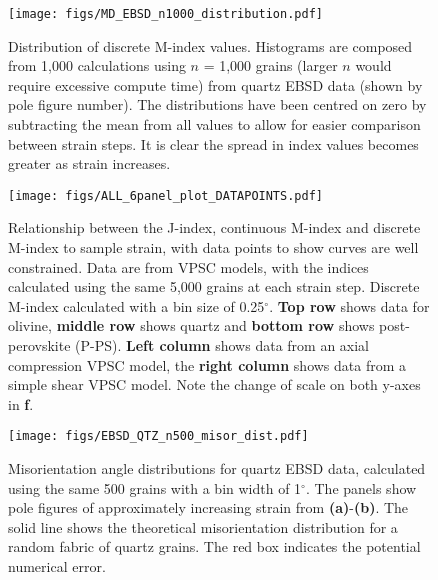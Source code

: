 \documentclass[a4paper,12pt,twoside]{report}
\numberwithin{equation}{chapter}
\begin{document}
\begin{figure}[h!]
  \centering
    \texttt{[image: figs/MD\_EBSD\_n1000\_distribution.pdf]}
  \caption[Discrete M-index distribution (quartz EBSD)]{Distribution of discrete M-index values. Histograms are composed from 1,000 calculations using $n$ = 1,000 grains (larger $n$ would require excessive compute time) from quartz EBSD data (shown by pole figure number). The distributions have been centred on zero by subtracting the mean from all values to allow for easier comparison between strain steps. It is clear the spread in index values becomes greater as strain increases.}
  \label{fig:app:MD_EBSD_dist}
\end{figure} 

\begin{figure*}[p]
  \centering
    \texttt{[image: figs/ALL\_6panel\_plot\_DATAPOINTS.pdf]}
  \caption[Relation of indices to strain (VPSC, with data points)]{Relationship between the J-index, continuous M-index and discrete M-index to sample strain, with data points to show curves are well constrained. Data are from VPSC models, with the indices calculated using the same 5,000 grains at each strain step. Discrete M-index calculated with a bin size of 0.25$^\circ$. \textbf{Top row} shows data for olivine, \textbf{middle row} shows quartz and \textbf{bottom row} shows post-perovskite (P-PS). \textbf{Left column} shows data from an axial compression VPSC model, the \textbf{right column} shows data from a simple shear VPSC model. Note the change of scale on both y-axes in \textbf{f}.}
  \label{fig:app:indices_vs_strain_DATAPOINTS}
\end{figure*} 

\begin{figure}[h!]
  \centering
    \texttt{[image: figs/EBSD\_QTZ\_n500\_misor\_dist.pdf]}
  \caption[Misorientation angle distribution (quartz EBSD)]{Misorientation angle distributions for quartz EBSD data, calculated using the same 500 grains with a bin width of 1$^{\circ}$. The panels show pole figures of approximately increasing strain from \textbf{(a)}-\textbf{(b)}. The solid line shows the theoretical misorientation distribution for a random fabric of quartz grains. The red box indicates the potential numerical error.} 
  \label{fig:APP_misor_dist_qtz_ebsd}
\end{figure} 
\end{document}
